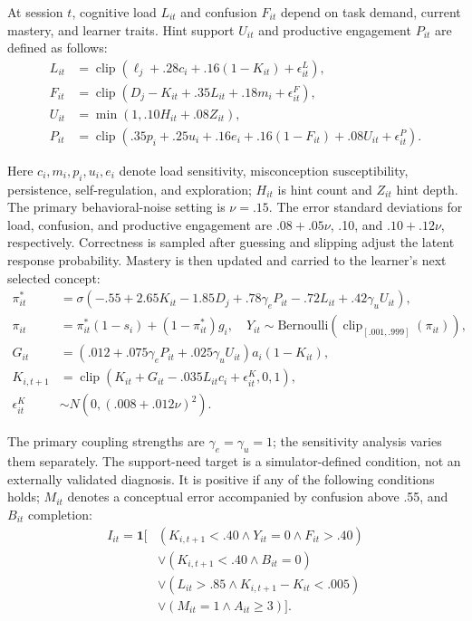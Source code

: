 \documentclass[11pt]{article}
\newcommand{\clip}{\operatorname{clip}}
\begin{document}
At session $t$, cognitive load $L_{it}$ and confusion $F_{it}$ depend on task demand, current mastery, and learner traits. Hint support $U_{it}$ and productive engagement $P_{it}$ are defined as follows:
\begin{equation}
\begin{aligned}
L_{it} &= \clip(\ell_j + .28c_i + .16(1-K_{it}) + \epsilon_{it}^L),\\
F_{it} &= \clip(D_j - K_{it} + .35L_{it} + .18m_i + \epsilon_{it}^F),\\
U_{it} &= \min(1, .10H_{it} + .08Z_{it}),\\
P_{it} &= \clip(.35p_i + .25u_i + .16e_i + .16(1-F_{it}) + .08U_{it} + \epsilon_{it}^P).
\end{aligned}
\end{equation}

{\sloppy Here $c_i, m_i, p_i, u_i, e_i$ denote load sensitivity, misconception susceptibility, persistence, self-regulation, and exploration; $H_{it}$ is hint count and $Z_{it}$ hint depth. The primary behavioral-noise setting is $\nu=.15$. The error standard deviations for load, confusion, and productive engagement are $.08+.05\nu$, .10, and $.10+.12\nu$, respectively. Correctness is sampled after guessing and slipping adjust the latent response probability. Mastery is then updated and carried to the learner’s next selected concept:
\begin{equation}
\begin{aligned}
\pi_{it}^* &= \sigma(-.55 + 2.65K_{it} - 1.85D_j + .78\gamma_e P_{it} - .72L_{it} + .42\gamma_u U_{it}),\\
\pi_{it} &= \pi_{it}^*(1-s_i) + (1-\pi_{it}^*)g_i, \quad Y_{it} \sim \mathrm{Bernoulli}(\clip_{[.001,.999]}(\pi_{it})),\\
G_{it} &= (.012 + .075\gamma_e P_{it} + .025\gamma_u U_{it})a_i(1-K_{it}),\\
K_{i,t+1} &= \clip(K_{it} + G_{it} - .035L_{it}c_i + \epsilon_{it}^K, 0, 1),\\
\epsilon_{it}^K &\sim N(0, (.008 + .012\nu)^2).
\end{aligned}
\end{equation}}

The primary coupling strengths are $\gamma_e=\gamma_u=1$; the sensitivity analysis varies them separately. The support-need target is a simulator-defined condition, not an externally validated diagnosis. It is positive if any of the following conditions holds; $M_{it}$ denotes a conceptual error accompanied by confusion above .55, and $B_{it}$ completion:
\begin{equation}
\begin{aligned}
I_{it} = \mathbf{1}\bigl[&(K_{i,t+1} < .40 \wedge Y_{it} = 0 \wedge F_{it} > .40)\\
&\vee (K_{i,t+1} < .40 \wedge B_{it} = 0)\\
&\vee (L_{it} > .85 \wedge K_{i,t+1} - K_{it} < .005)\\
&\vee (M_{it} = 1 \wedge A_{it} \geq 3)\bigr].
\end{aligned}
\end{equation}
\end{document}
